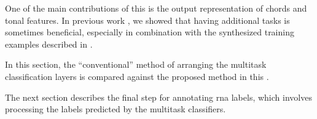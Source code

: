 
One of the main contributions of this \thesisdiss{} is the
output representation of chords and tonal features. In
previous work \parencite{napoleslopez2021augmentednet}, we
showed that having additional tasks is sometimes beneficial,
especially in combination with the synthesized training
examples described in
.

In this section, the ``conventional'' method of arranging
the multitask classification layers is compared against the
proposed method in this \thesisdiss{}.

The next section describes the final step for annotating
\gls{rna} labels, which involves processing the labels
predicted by the multitask classifiers.


